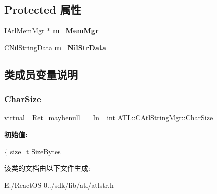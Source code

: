 \subsection*{Protected 属性}
\begin{DoxyCompactItemize}
\item 
\mbox{\label{class_a_t_l_1_1_c_atl_string_mgr_a86b29309eb68ae00bdb935cfbf067fae}} 
\hyperlink{class_a_t_l_1_1_i_atl_mem_mgr}{I\+Atl\+Mem\+Mgr} $\ast$ {\bfseries m\+\_\+\+Mem\+Mgr}
\item 
\mbox{\label{class_a_t_l_1_1_c_atl_string_mgr_a66bf0755725194e064b2489453b01f19}} 
\hyperlink{class_a_t_l_1_1_c_nil_string_data}{C\+Nil\+String\+Data} {\bfseries m\+\_\+\+Nil\+Str\+Data}
\end{DoxyCompactItemize}


\subsection{类成员变量说明}
\mbox{\label{class_a_t_l_1_1_c_atl_string_mgr_a98a740def56c455c5726c50c2314b3e7}} 
\subsubsection{\texorpdfstring{Char\+Size}{CharSize}}
{\footnotesize\ttfamily virtual \+\_\+\+Ret\+\_\+maybenull\+\_\+ \+\_\+\+In\+\_\+ int A\+T\+L\+::\+C\+Atl\+String\+Mgr\+::\+Char\+Size}

{\bfseries 初始值\+:}
\begin{DoxyCode}
\{
        \textcolor{keywordtype}{size\_t} SizeBytes
\end{DoxyCode}


该类的文档由以下文件生成\+:\begin{DoxyCompactItemize}
\item 
E\+:/\+React\+O\+S-\/0../sdk/lib/atl/atlstr.\+h\end{DoxyCompactItemize}
